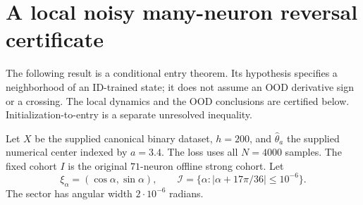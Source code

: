 \section{A local noisy many-neuron reversal certificate}
\label{sec:local-result}
The following result is a conditional entry theorem. Its hypothesis specifies
a neighborhood of an ID-trained state; it does not assume an OOD derivative
sign or a crossing. The local dynamics and the OOD conclusions are certified
below. Initialization-to-entry is a separate unresolved inequality.

Let $X$ be the supplied canonical binary dataset, $h=200$, and
$\widehat\theta_a$ the supplied numerical center indexed by $a=3.4$.
The loss uses all $N=4000$ samples. The fixed cohort $I$ is the original
$71$-neuron offline strong cohort. Let
\[
 \xi_\alpha=(\cos\alpha,\sin\alpha),\qquad
 \mathcal I=\{\alpha:|\alpha+17\pi/36|\le10^{-6}\}.
\]
The sector has angular width $2\cdot10^{-6}$ radians.

